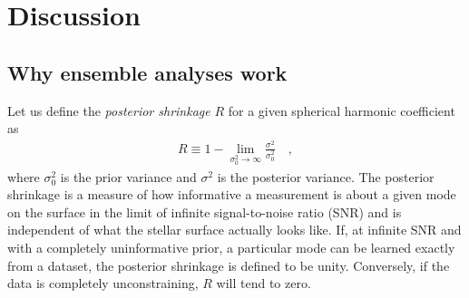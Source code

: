 \documentclass[modern]{aastex62}
\begin{document}


\section{Discussion}
\label{sec:discussion}

\subsection{Why ensemble analyses work}
\label{sec:ensemble}


Let us define the \emph{posterior shrinkage} $R$ for a given
spherical harmonic coefficient as
%
\begin{align}
    \label{eq:shrinkage}
    R \equiv 1 - \lim\limits_{\sigma_0^2 \rightarrow \infty}
    \frac{\sigma^2}{\sigma_0^2}
    \quad,
\end{align}
%
where $\sigma_0^2$ is the prior variance
and $\sigma^2$ is the posterior variance.
The posterior shrinkage is a measure of how informative a measurement is about a
given mode on the surface in the limit of infinite signal-to-noise ratio (SNR)
and is independent of what the stellar surface actually looks like.
If, at infinite SNR and with a completely uninformative prior,
a particular mode can be learned exactly from a dataset, the posterior
shrinkage is defined to be unity. Conversely, if the data is completely
unconstraining, $R$ will tend to zero.
\end{document}
